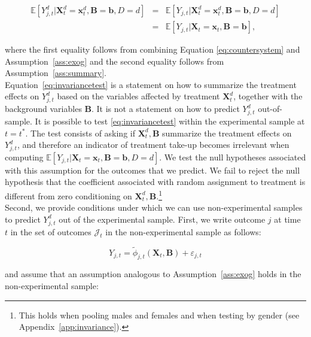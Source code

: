 \begin{eqnarray}
\mathbb{E} \left[ Y_{j,t}^d | \bm{X}_{t}^d  = \bm{x}_{t}^d, \bm{B} = \bm{b}, D = d \right] &=&  \mathbb{E} \left[ Y_{j,t} | \bm{X}_{t}^d  = \bm{x}_{t}^d, \bm{B} = \bm{b}, D = d \right] \\ \nonumber
&=&\mathbb{E} \left[ Y_{j,t} | \bm{X}_{t}  = \bm{x}_{t}, \bm{B} =  \bm{b} \right], \label{eq:invariancetest}
\end{eqnarray}

\noindent where the first equality follows from combining Equation \eqref{eq:countersystem} and Assumption~\ref{ass:exog} and the second equality follows from  Assumption~\ref{ass:summary}.\\

\noindent Equation~\ref{eq:invariancetest} is a statement on how to summarize the treatment effects on $Y_{j,t}^d$ based on the variables affected by treatment $\bm{X}_{t}^d$, together with the background variables $\bm{B}$. It is not a statement on how to predict $Y_{j,t}^d$ out-of-sample. It is possible to test \eqref{eq:invariancetest} within the experimental sample at $t = t^*$. The test consists of asking if $\bm{X}_{t}^d, \bm{B}$ summarize the treatment effects on  $Y_{j,t}^d$, and therefore an indicator of treatment take-up becomes irrelevant when computing $\mathbb{E} \left[ Y_{j,t} | \bm{X}_{t}  = \bm{x}_{t}, \bm{B} =  \bm{b}, D = d \right]$. We test the null hypotheses associated with this assumption for the outcomes that we predict. We fail to reject the null  hypothesis that the coefficient associated with random assignment to treatment is different from zero conditioning on $\bm{X}_{t}^d, \bm{B}$.\footnote{This holds when pooling males and females and when testing by gender (see Appendix~\ref{app:invariance}).}\\

\noindent Second, we provide conditions under which we can use non-experimental samples to predict $Y_{j,t}^d$ out of the experimental sample. First, we write outcome $j$ at time $t$ in the set of outcomes $\mathcal{J}_{t}$ in the non-experimental sample as follows: 

\begin{equation}
Y_{j,t} = \widetilde{\phi}_{j,t} \left( \bm{X}_{t}, \bm{B} \right) + \varepsilon_{j,t} \label{eq:outcomenonexp}
\end{equation} 

\noindent and assume that an assumption analogous to Assumption~\ref{ass:exog} holds in the non-experimental sample:

